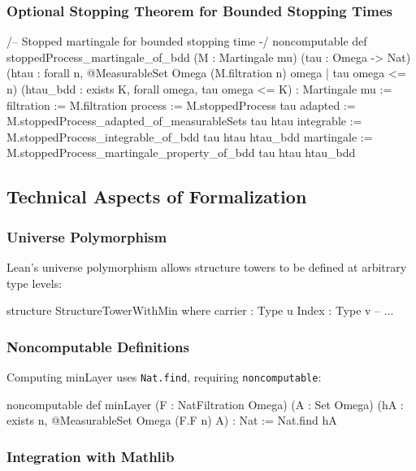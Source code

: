 \documentclass[11pt,a4paper]{article}
\theoremstyle{plain}
\theoremstyle{definition}
\begin{document}
\subsubsection{Optional Stopping Theorem for Bounded Stopping Times}

\begin{leancode}
/-- Stopped martingale for bounded stopping time -/
noncomputable def stoppedProcess_martingale_of_bdd
    (M : Martingale mu)
    (tau : Omega -> Nat)
    (htau : forall n, @MeasurableSet Omega (M.filtration n) 
            {omega | tau omega <= n})
    (htau_bdd : exists K, forall omega, tau omega <= K) :
  Martingale mu :=
{ filtration := M.filtration
  process := M.stoppedProcess tau
  adapted := M.stoppedProcess_adapted_of_measurableSets tau htau
  integrable := M.stoppedProcess_integrable_of_bdd tau htau htau_bdd
  martingale := M.stoppedProcess_martingale_property_of_bdd 
                tau htau htau_bdd }
\end{leancode}

\subsection{Technical Aspects of Formalization}

\subsubsection{Universe Polymorphism}

Lean's universe polymorphism allows structure towers to be defined at 
arbitrary type levels:
\begin{leancode}
structure StructureTowerWithMin where
  carrier : Type u
  Index : Type v
  -- ...
\end{leancode}

\subsubsection{Noncomputable Definitions}

Computing minLayer uses \texttt{Nat.find}, requiring \texttt{noncomputable}:
\begin{leancode}
noncomputable def minLayer (F : NatFiltration Omega) (A : Set Omega)
    (hA : exists n, @MeasurableSet Omega (F.F n) A) : Nat :=
  Nat.find hA
\end{leancode}

\subsubsection{Integration with Mathlib}
\end{document}
